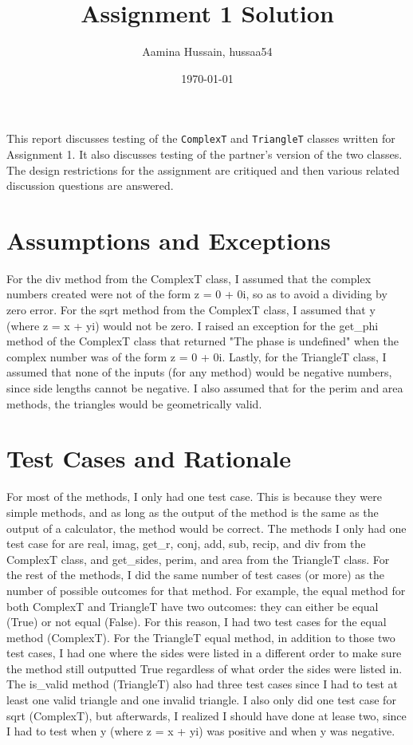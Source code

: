 \documentclass[12pt]{article}
\title{Assignment 1 Solution}
\author{Aamina Hussain, hussaa54}
\date{\today}
\begin{document}
\maketitle

This report discusses testing of the \verb|ComplexT| and \verb|TriangleT|
classes written for Assignment 1. It also discusses testing of the partner's
version of the two classes. The design restrictions for the assignment
are critiqued and then various related discussion questions are answered.

\section{Assumptions and Exceptions} \label{AssumptAndExcept}

For the div method from the ComplexT class, I assumed that the complex numbers created were not of the form z = 0 + 0i, so as to avoid a dividing by zero error. For the sqrt method from the ComplexT class, I assumed that y (where z = x + yi) would not be zero. I raised an exception for the get\_phi method of the ComplexT class that returned "The phase is undefined" when the complex number was of the form z = 0 + 0i. Lastly, for the TriangleT class, I assumed that none of the inputs (for any method) would be negative numbers, since side lengths cannot be negative. I also assumed that for the perim and area methods, the triangles would be geometrically valid.

\section{Test Cases and Rationale} \label{Testing}

For most of the methods, I only had one test case. This is because they were simple methods, and as long as the output of the method is the same as the output of a calculator, the method would be correct. The methods I only had one test case for are real, imag, get\_r, conj, add, sub, recip, and div from the ComplexT class, and get\_sides, perim, and area from the TriangleT class. For the rest of the methods, I did the same number of test cases (or more) as the number of possible outcomes for that method. For example, the equal method for both ComplexT and TriangleT have two outcomes: they can either be equal (True) or not equal (False). For this reason, I had two test cases for the equal method (ComplexT). For the TriangleT equal method, in addition to those two test cases, I had one where the sides were listed in a different order to make sure the method still outputted True regardless of what order the sides were listed in. The is\_valid method (TriangleT) also had three test cases since I had to test at least one valid triangle and one invalid triangle. I also only did one test case for sqrt (ComplexT), but afterwards, I realized I should have done at lease two, since I had to test when y (where z = x + yi) was positive and when y was negative. 
\end{document}
